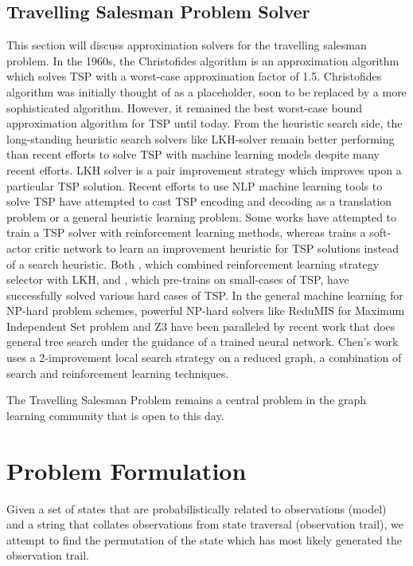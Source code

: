 \documentclass[10pt, conference, compsocconf]{IEEEtran}
\begin{document}
\subsection{Travelling Salesman Problem Solver}
This section will discuss approximation solvers for the travelling salesman problem. In the 1960s, the Christofides algorithm is an approximation algorithm which solves TSP with a worst-case approximation factor of 1.5. Christofides algorithm was initially thought of as a placeholder, soon to be replaced by a more sophisticated algorithm. However, it remained the best worst-case bound approximation algorithm for TSP until today. From the heuristic search side, the long-standing heuristic search solvers like LKH-solver remain better performing than recent efforts to solve TSP with machine learning models despite many recent efforts. LKH solver is a pair improvement strategy which improves upon a particular TSP solution. Recent efforts to use NLP machine learning tools to solve TSP have attempted to cast TSP encoding and decoding as a translation problem or a general heuristic learning problem. Some works have attempted to train a TSP solver with reinforcement learning methods, whereas \cite{impr} trains a soft-actor critic network to learn an improvement heuristic for TSP solutions instead of a search heuristic. Both \cite{strat}, which combined reinforcement learning strategy selector with LKH, and \cite{pret}, which pre-trains on small-cases of TSP, have successfully solved various hard cases of TSP. In the general machine learning for NP-hard problem schemes, powerful NP-hard solvers like ReduMIS for Maximum Independent Set problem and Z3 have been paralleled by recent work that does general tree search under the guidance of a trained neural network. Chen's work \cite{qifeng} uses a 2-improvement local search strategy on a reduced graph, a combination of search and reinforcement learning techniques.

The Travelling Salesman Problem remains a central problem in the graph learning community that is open to this day. 

\section{Problem Formulation}
Given a set of states that are probabilistically related to observations (model) and a string that collates observations from state traversal (observation trail), we attempt to find the permutation of the state which has most likely generated the observation trail. 
\end{document}
